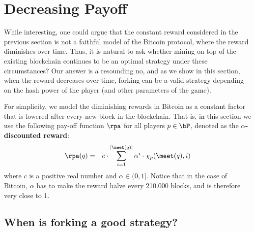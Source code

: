 
\section{Decreasing Payoff}
\label{sec-dec}


While interesting, one could argue that the constant reward considered in the previous section is not a faithful model of the Bitcoin protocol, where the reward diminishes over time. Thus, it is natural to ask whether  mining on top of the existing blockchain continues to be an  optimal strategy under these 
circumstances? Our answer is a resounding no, and as we show in this section, when the reward decreases over time, forking can be a valid strategy depending on the hash power of the player (and other parameters of the game). 

For simplicity, we model the diminishing rewards in Bitcoin as a constant factor that is lowered after every new block in the blockchain. That is, in this section 
we use the following pay-off function $\rpa$ for all players $p \in \bP$, denoted as the \textbf{$\alpha$-discounted reward}: 
\begin{eqnarray*}
\rpa(q) & = & 
{\displaystyle c \cdot \sum_{i=1}^{|\meet(q)|} \alpha^i \cdot \chi_p(\meet(q),i)} \end{eqnarray*}
where $c$ is a positive real number and $\alpha \in (0,1]$. Notice that in the case of Bitcoin, $\alpha$ has to make the reward halve every 210.000 blocks, and is therefore very close to 1.

%

\subsection{When is forking a good strategy?}
\label{sec-forkingstrategies}

